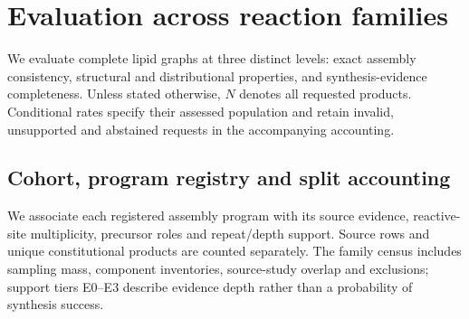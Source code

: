 \section{Evaluation across reaction families}
\label{app:22-results}
We evaluate complete lipid graphs at three distinct levels: exact assembly consistency, structural
and distributional properties, and synthesis-evidence completeness. Unless stated otherwise, $N$
denotes all requested products. Conditional rates specify their assessed population and retain
invalid, unsupported and abstained requests in the accompanying accounting.

\subsection{Cohort, program registry and split accounting}
We associate each registered assembly program with its source evidence, reactive-site multiplicity,
precursor roles and repeat/depth support. Source rows and unique constitutional products are counted
separately. The family census includes sampling mass, component inventories, source-study overlap
and exclusions; support tiers E0--E3 describe evidence depth rather than a probability of synthesis
success.
